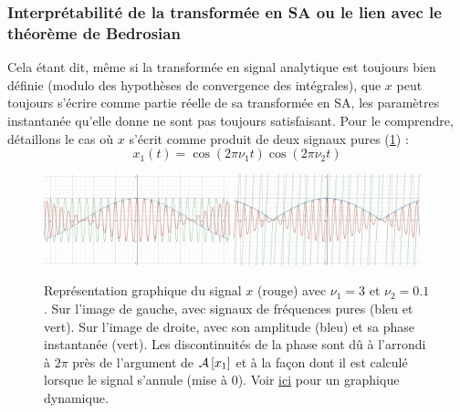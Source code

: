\subsubsection{Interprétabilité de la transformée en SA ou le lien avec le théorème de Bedrosian}\label{ann:bedrosian}

Cela étant dit, même si la transformée en signal analytique est toujours bien définie (modulo des hypothèses de convergence des intégrales), que $x$ peut toujours s'écrire comme partie réelle de sa transformée en SA, les paramètres instantanée qu'elle donne ne sont pas toujours satisfaisant. 
Pour le comprendre, détaillons le cas où $x$ s'écrit comme produit de deux signaux pures (\cref{fig:exemple_tSA_1/2}) :
\[x_1(t) = \cos (2\pi\nu_1t)\cos (2\pi\nu_2t)\]

\begin{figure}[h]\centering
	\includegraphics[width=0.48\textwidth]{fig/part-1/ex SA - 11.png}
	\hfill
	\includegraphics[width=0.48\textwidth]{fig/part-1/ex SA - 12.png}
	\caption[\DONE Décomposition en signal analytique d'un produit de cosinus]{Représentation graphique du signal $x$ (rouge) avec $\nu_1=3$ et $\nu_2=0.1$. Sur l'image de gauche, avec signaux de fréquences pures (bleu et vert). Sur l'image de droite, avec son amplitude (bleu) et sa phase instantanée (vert). Les discontinuités de la phase sont dû à l'arrondi à $2\pi$  près de l'argument de $\mathcal{A}\left[x_1\right]$ et à la façon dont il est calculé lorsque le signal s'annule (mise à 0). Voir \href{https://www.desmos.com/calculator/gcedcdfkhr}{ici} pour un graphique dynamique.}
	\label{fig:exemple_tSA_1/2}
\end{figure}

